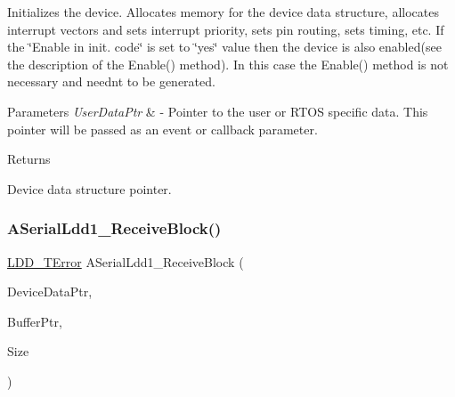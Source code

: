 Initializes the device. Allocates memory for the device data structure, allocates interrupt vectors and sets interrupt priority, sets pin routing, sets timing, etc. If the \char`\"{}\+Enable
    in init. code\char`\"{} is set to \char`\"{}yes\char`\"{} value then the device is also enabled(see the description of the Enable() method). In this case the Enable() method is not necessary and needn\textquotesingle{}t to be generated. 


\begin{DoxyParams}{Parameters}
{\em User\+Data\+Ptr} & -\/ Pointer to the user or R\+T\+OS specific data. This pointer will be passed as an event or callback parameter. \\
\hline
\end{DoxyParams}
\begin{DoxyReturn}{Returns}

\begin{DoxyItemize}
\item Device data structure pointer. 
\end{DoxyItemize}
\end{DoxyReturn}
\mbox{\label{group___a_serial_ldd1__module_gad445e8cc518c6e88fc212bd6d4e06490}} 
\subsubsection{\texorpdfstring{A\+Serial\+Ldd1\+\_\+\+Receive\+Block()}{ASerialLdd1\_ReceiveBlock()}}
{\footnotesize\ttfamily \hyperlink{group___p_e___types__module_ga24c2b045fd04e79e85f261ce4df35588}{L\+D\+D\+\_\+\+T\+Error} A\+Serial\+Ldd1\+\_\+\+Receive\+Block (\begin{DoxyParamCaption}\item[{\hyperlink{group___p_e___types__module_gac5cf1362f1f0e3a2ce71b1bf2276d091}{L\+D\+D\+\_\+\+T\+Device\+Data} $\ast$}]{Device\+Data\+Ptr,  }\item[{\hyperlink{group___p_e___types__module_gade8ef9401405bd941b6da738b807f980}{L\+D\+D\+\_\+\+T\+Data} $\ast$}]{Buffer\+Ptr,  }\item[{uint16\+\_\+t}]{Size }\end{DoxyParamCaption})}



